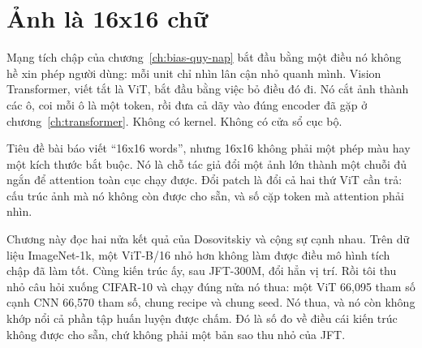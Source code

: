 \chapter{Ảnh là 16x16 chữ}
\label{ch:vit}

Mạng tích chập của chương~\ref{ch:bias-quy-nap} bắt đầu bằng một điều nó không
hề xin phép người dùng: mỗi unit chỉ nhìn lân cận nhỏ quanh mình. Vision
Transformer, viết tắt là ViT, bắt đầu bằng việc bỏ điều đó đi. Nó cắt ảnh thành
các ô, coi mỗi ô là một token, rồi đưa cả dãy vào đúng encoder đã gặp ở
chương~\ref{ch:transformer}. Không có kernel. Không có cửa sổ cục bộ.

Tiêu đề bài báo viết \enquote{16x16 words}, nhưng 16x16 không phải một phép màu
hay một kích thước bắt buộc. Nó là chỗ tác giả đổi một ảnh lớn thành một chuỗi
đủ ngắn để attention toàn cục chạy được. Đổi patch là đổi cả hai thứ ViT cần
trả: cấu trúc ảnh mà nó không còn được cho sẵn, và số cặp token mà attention
phải nhìn.

Chương này đọc hai nửa kết quả của Dosovitskiy và cộng sự cạnh nhau. Trên dữ
liệu ImageNet-1k, một ViT-B/16 nhỏ hơn không làm được điều mô hình tích chập
đã làm tốt. Cùng kiến trúc ấy, sau JFT-300M, đổi hẳn vị trí. Rồi tôi thu nhỏ
câu hỏi xuống CIFAR-10 và chạy đúng nửa nó thua: một ViT 66,095 tham số cạnh
CNN 66,570 tham số, chung recipe và chung seed. Nó thua, và nó còn không khớp
nổi cả phần tập huấn luyện được chấm. Đó là số đo về điều cái kiến trúc không được cho sẵn, chứ
không phải một bản sao thu nhỏ của JFT.








